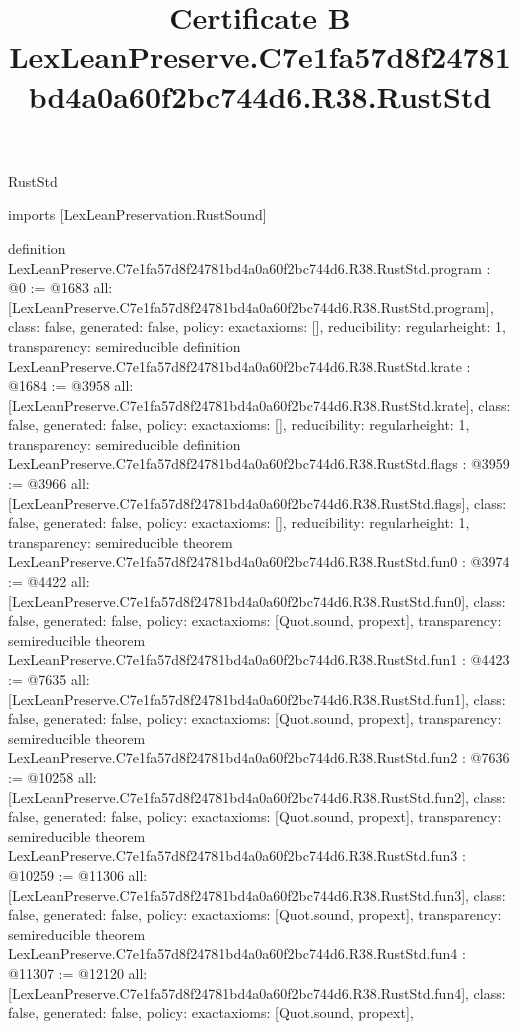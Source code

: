 \begin{lexlean}{RustStd}
\title{Certificate B LexLeanPreserve.C7e1fa57d8f24781bd4a0a60f2bc744d6.R38.RustStd}
\begin{coremodule}
imports [LexLeanPreservation.RustSound]

definition LexLeanPreserve.C7e1fa57d8f24781bd4a0a60f2bc744d6.R38.RustStd.program : @0 := @1683 {
  all: [LexLeanPreserve.C7e1fa57d8f24781bd4a0a60f2bc744d6.R38.RustStd.program],
  class: false,
  generated: false,
  policy: exact{axioms: []},
  reducibility: regular{height: 1},
  transparency: semireducible
}
definition LexLeanPreserve.C7e1fa57d8f24781bd4a0a60f2bc744d6.R38.RustStd.krate : @1684 := @3958 {
  all: [LexLeanPreserve.C7e1fa57d8f24781bd4a0a60f2bc744d6.R38.RustStd.krate],
  class: false,
  generated: false,
  policy: exact{axioms: []},
  reducibility: regular{height: 1},
  transparency: semireducible
}
definition LexLeanPreserve.C7e1fa57d8f24781bd4a0a60f2bc744d6.R38.RustStd.flags : @3959 := @3966 {
  all: [LexLeanPreserve.C7e1fa57d8f24781bd4a0a60f2bc744d6.R38.RustStd.flags],
  class: false,
  generated: false,
  policy: exact{axioms: []},
  reducibility: regular{height: 1},
  transparency: semireducible
}
theorem LexLeanPreserve.C7e1fa57d8f24781bd4a0a60f2bc744d6.R38.RustStd.fun0 : @3974 := @4422 {
  all: [LexLeanPreserve.C7e1fa57d8f24781bd4a0a60f2bc744d6.R38.RustStd.fun0],
  class: false,
  generated: false,
  policy: exact{axioms: [Quot.sound, propext]},
  transparency: semireducible
}
theorem LexLeanPreserve.C7e1fa57d8f24781bd4a0a60f2bc744d6.R38.RustStd.fun1 : @4423 := @7635 {
  all: [LexLeanPreserve.C7e1fa57d8f24781bd4a0a60f2bc744d6.R38.RustStd.fun1],
  class: false,
  generated: false,
  policy: exact{axioms: [Quot.sound, propext]},
  transparency: semireducible
}
theorem LexLeanPreserve.C7e1fa57d8f24781bd4a0a60f2bc744d6.R38.RustStd.fun2 : @7636 := @10258 {
  all: [LexLeanPreserve.C7e1fa57d8f24781bd4a0a60f2bc744d6.R38.RustStd.fun2],
  class: false,
  generated: false,
  policy: exact{axioms: [Quot.sound, propext]},
  transparency: semireducible
}
theorem LexLeanPreserve.C7e1fa57d8f24781bd4a0a60f2bc744d6.R38.RustStd.fun3 : @10259 := @11306 {
  all: [LexLeanPreserve.C7e1fa57d8f24781bd4a0a60f2bc744d6.R38.RustStd.fun3],
  class: false,
  generated: false,
  policy: exact{axioms: [Quot.sound, propext]},
  transparency: semireducible
}
theorem LexLeanPreserve.C7e1fa57d8f24781bd4a0a60f2bc744d6.R38.RustStd.fun4 : @11307 := @12120 {
  all: [LexLeanPreserve.C7e1fa57d8f24781bd4a0a60f2bc744d6.R38.RustStd.fun4],
  class: false,
  generated: false,
  policy: exact{axioms: [Quot.sound, propext]},
}
\end{coremodule}
\end{lexlean}
